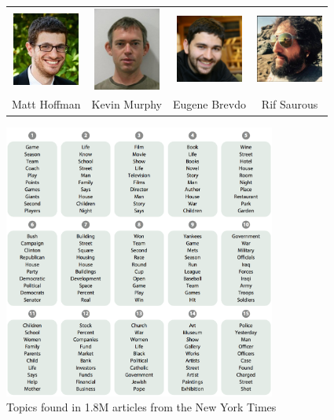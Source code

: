 \documentclass[10pt,
               xcolor={usenames,dvipsnames},
               hyperref={colorlinks,linktoc=all,citecolor=Plum,linkcolor=MidnightBlue,urlcolor=MidnightBlue},noamssymb]{beamer}
\begin{document}
\begin{frame}[plain]
\begin{center}
\begin{tabular}{cccc}
\includegraphics[width=22mm]{img/matt.jpg} &
\includegraphics[width=22mm]{img/kevin.jpg} &
\includegraphics[width=22mm]{img/eugene.jpg} &
\includegraphics[width=22mm]{img/rif.png}\\
Matt Hoffman & Kevin Murphy & Eugene Brevdo & Rif Saurous\\
\end{tabular}
\end{center}
\end{frame}

\begin{frame}[plain,t]
\vspace{2ex}
\begin{center}
\includegraphics[width=0.67\textwidth]{img/nytimes.png}
\\[2ex]
Topics found in 1.8M articles from the New York Times
\end{center}
\end{frame}
\end{document}
